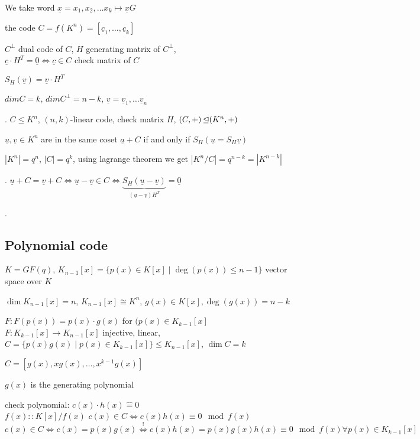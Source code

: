We take word $\underline{x} = x_1, x_2, \ldots x_k \mapsto \underline{x} G$

the code $C = f(K^n) = [\underline{c}_1, \ldots, \underline{c}_k]$

$C^\bot$ dual code of $C$, $H$ generating matrix of $C^\bot$, \\
$\underline{c}\cdot H^T = \underline{0} \Leftrightarrow \underline{c} \in C$ check matrix of $C$

$S_H(\underline{v}) = \underline{v} \cdot H^T$

$dim C = k$, $dim C^\bot = n-k$, $\underline{v} = \underline{v}_1, \ldots \underline{v}_n$

\Theorem.
$C\leq K^n$, $(n,k)$-linear code, check matrix $H$, $(C,+) \operatorname{\trianglelefteq} (K^n, +)$

$\underline{u}, \underline{v} \in K^n$ are in the same coset $\underline{a} + C$ if and only if $S_H(\underline{u} = S_H\underline{v})$

$|K^n| = q^n$, $|C| = q^k$, using lagrange theorem we get $|K^n / C| = q^{n-k} = |K^{n-k}|$

\Proof. 
$\underline{u} + C = \underline{v} + C \Leftrightarrow \underline{u} - \underline{v} \in C \Leftrightarrow \underbrace{S_H(\underline{u}-\underline{v})}_{(\underline{u}-\underline{v}) H^T} = \underline{0}$


\Example.

\subsection{Polynomial code}
$K= GF(q)$, $K_{n-1}[x] = \{p(x) \in K[x] \mid \deg(p(x)) \leq n-1\}$ vector space over $K$

$\dim K_{n-1}[x] = n$, $K_{n-1}[x] \cong K^n$, $g(x) \in K[x], \deg(g(x)) = n-k$

$F: F(p(x)) = p(x) \cdot g(x)$ for $(p(x) \in K_{k-1}[x]$\\
$F: K_{k-1}[x] \rightarrow K_{n-1}[x]$ injective, linear, $C= \{p(x)g(x) \mid p(x) \in K_{k-1}[x]\} \leq K_{n-1}[x]$, $\dim C = k$

$C= [g(x), xg(x), \ldots, x^{k-1} g(x)]$

$g(x)$ is the generating polynomial

check polynomial: $c(x)\cdot h(x) \hat{=} 0$\\
$f(x):: K[x] / f(x)$ \quad $c(x) \in C \Leftrightarrow c(x)h(x) \equiv 0 \mod f(x)$\\
$c(x) \in C \Leftrightarrow c(x) = p(x)g(x) \stackrel{!}{\Leftrightarrow} c(x)h(x)=p(x)g(x)h(x) \equiv 0 \mod f(x) \forall p(x) \in K_{k-1}[x]$

